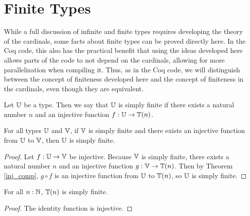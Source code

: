 \documentclass[../../math.tex]{subfiles}
\begin{document}
\section{Finite Types}

While a full discussion of infinite and finite types requires developing the
theory of the cardinals, some facts about finite types can be proved directly
here.  In the Coq code, this also has the practical benefit that using the ideas
developed here allows parts of the code to not depend on the cardinals, allowing
for more parallelization when compiling it.  Thus, as in the Coq code, we will
distinguish between the concept of finiteness developed here and the concept of
finiteness in the cardinals, even though they are equivalent.

\begin{definition}
    Let $\mathbb{U}$ be a type.  Then we say that $\mathbb{U}$ is simply finite if there exists
    a natural number $n$ and an injective function $f : \mathbb{U} \to \mathbb{T}(n)$.
\end{definition}

\begin{theorem} \label{simple_finite_trans}
    For all types $\mathbb{U}$ and $\mathbb{V}$, if $\mathbb{V}$ is simply finite and there exists an
    injective function from $\mathbb{U}$ to $\mathbb{V}$, then $\mathbb{U}$ is simply finite.
\end{theorem}
\begin{proof}
    Let $f : \mathbb{U} \to \mathbb{V}$ be injective.  Because $\mathbb{V}$ is simply finite, there
    exists a natural number $n$ and an injective function $g : \mathbb{V} \to \mathbb{T}(n)$.
    Then by Theorem \ref{inj_comp}, $g \circ f$ is an injective function from
    $\mathbb{U}$ to $\mathbb{T}(n)$, so $\mathbb{U}$ is simply finite.
\end{proof}

\begin{theorem} \label{simple_finite_nat}
    For all $n : \mathbb{N}$, $\mathbb{T}(n)$ is simply finite.
\end{theorem}
\begin{proof}
    The identity function is injective.
\end{proof}
\end{document}
